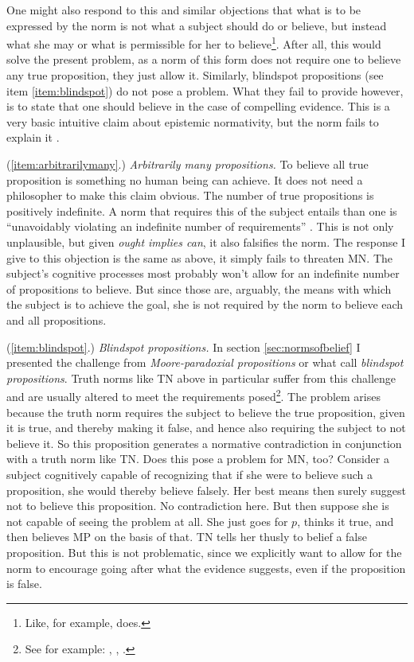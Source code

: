 \documentclass[12pt,numbers=noenddot]{scrartcl}
\begin{document}
One might also respond to this and similar objections that what is to be expressed by the norm is not what a subject should do or believe, but instead what she may or what is permissible for her to believe\footnote{Like, for example, \textcite{Whiting2013-WHITTA-3} does.}. After all, this would solve the present problem, as a norm of this form does not require one to believe any true proposition, they just allow it. Similarly, blindspot propositions (see item \ref{item:blindspot}) do not pose a problem. What they fail to provide however, is to state that one should believe in the case of compelling evidence. This is a very basic intuitive claim about epistemic normativity, but the norm fails to explain it \textcite[18]{Mchugh2012-MCHTTN}.

(\ref{item:arbitrarilymany}.) \emph{Arbitrarily many propositions.}
To believe all true proposition is something no human being can achieve. It does not need a philosopher to make this claim obvious. The number of true propositions is positively indefinite. A norm that requires this of the subject entails than one is “unavoidably violating an indefinite number of requirements” \autocite[12]{Mchugh2012-MCHTTN}. This is not only unplausible, but given \emph{ought implies can}, it also falsifies the norm. The response I give to this objection is the same as above, it simply fails to threaten MN. The subject's cognitive processes most probably won't allow for an indefinite number of propositions to believe. But since those are, arguably, the means with which the subject is to achieve the goal, she is not required by the norm to believe each and all propositions.

(\ref{item:blindspot}.) \emph{Blindspot propositions.}
In section \ref{sec:normsofbelief} I presented the challenge from \emph{Moore-paradoxial propositions} or what \textcite[281]{Bykvist2007-BYKDTI} call \emph{blindspot propositions}. Truth norms like TN above in particular suffer from this challenge and are usually altered to meet the requirements posed\footnote{See for example: \textcite[282]{Bykvist2007-BYKDTI}, \textcite[12]{Mchugh2012-MCHTTN}, \textcite[6]{Greenberg2016-GREITN}.}. The problem arises because the truth norm requires the subject to believe the true proposition, given it is true, and thereby making it false, and hence also requiring the subject to not believe it. So this proposition generates a normative contradiction in conjunction with a truth norm like TN. Does this pose a problem for MN, too? Consider a subject cognitively capable of recognizing that if she were to believe such a proposition, she would thereby believe falsely. Her best means then surely suggest not to believe this proposition. No contradiction here. But then suppose she is not capable of seeing the problem at all. She just goes for $p$, thinks it true, and then believes MP on the basis of that. TN tells her thusly to belief a false proposition. But this is not problematic, since we explicitly want to allow for the norm to encourage going after what the evidence suggests, even if the proposition is false.
\end{document}
